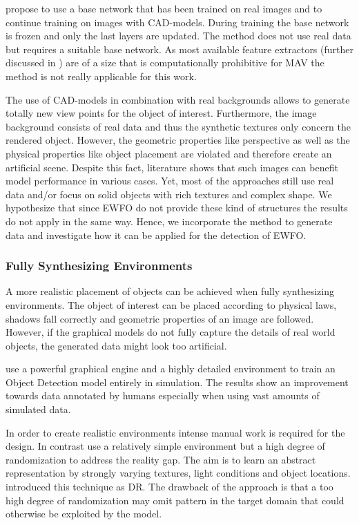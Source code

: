 \citeauthor{Hinterstoisser2017} \cite{Hinterstoisser2017} propose to use a base network that has been trained on real images and to continue training on images with \ac{CAD}-models. During training the base network is frozen and only the last layers are updated. The method does not use real data but requires a suitable base network. As most available feature extractors (further discussed in ) are of a size that is computationally prohibitive for \ac{MAV} the method is not really applicable for this work. 

The use of CAD-models in combination with real backgrounds allows to generate totally new view points for the object of interest. Furthermore, the image background consists of real data and thus the synthetic textures only concern the rendered object. However, the geometric properties like perspective as well as the physical properties like object placement are violated and therefore create an artificial scene. Despite this fact, literature shows that such images can benefit model performance in various cases. Yet, most of the approaches still use real data and/or focus on solid objects with rich textures and complex shape. We hypothesize that since \ac{EWFO} do not provide these kind of structures the results do not apply in the same way. Hence, we incorporate the method to generate data and investigate how it can be applied for the detection of \ac{EWFO}.

\subsubsection{Fully Synthesizing Environments}

A more realistic placement of objects can be achieved when fully synthesizing environments.  The object of interest can be placed according to physical laws, shadows fall correctly and geometric properties of an image are followed. However, if the graphical models do not fully capture the details of real world objects, the generated data might look too artificial.

\citeauthor{Johnson-Roberson2016} \cite{Johnson-Roberson2016} use a powerful graphical engine and a highly detailed environment to train an Object Detection model entirely in simulation. The results show an improvement towards data annotated by humans especially when using vast amounts of simulated data. 

In order to create realistic environments intense manual work is required for the design. In contrast \cite{Sadeghi2016, Tobin2017, Tremblay2018a} use a relatively simple environment but a high degree of randomization to address the reality gap. The aim is to learn an abstract representation by strongly varying textures, light conditions and object locations. \citeauthor{Tobin2017} introduced this technique as \ac{DR}. The drawback of the approach is that a too high degree of randomization may omit pattern in the target domain that could otherwise be exploited by the model. 

